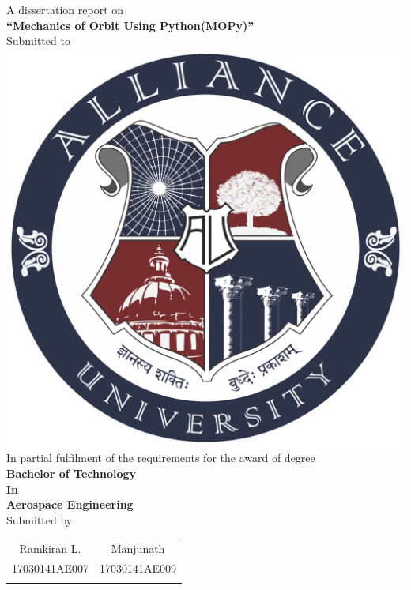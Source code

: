 \documentclass[12pt]{article}
\begin{document}
\begin{center}
\normalsize{A dissertation report on} \\ 
\vspace*{1em}
\Large{\textbf{\enquote{Mechanics of Orbit Using Python(MOPy)}}}\\ \vspace{0.5em}
\normalsize{Submitted to}\\ \vspace{1em}
\includegraphics[scale=0.7]{AU.png}\\ \vspace{1em}
\normalsize{In partial fulfilment of the requirements for the award of degree} \\
\Large{\textbf{Bachelor of Technology}}\\
\Large{\textbf{In}}\\
\Large{\textbf{Aerospace Engineering}}\\ \vspace*{1em}
\normalsize Submitted by: \vspace*{1em} \\
\normalsize
\begin{tabular}{cc}
Ramkiran L. & Manjunath \\ 
17030141AE007 & 17030141AE009 \\ 
\href{mailto:lramkiranBTECH17@ced.alliance.edu.in}{{\color{blue}{\fontfamily{ptm}\selectfont
}}}
\end{tabular}
\end{center}
\end{document}
